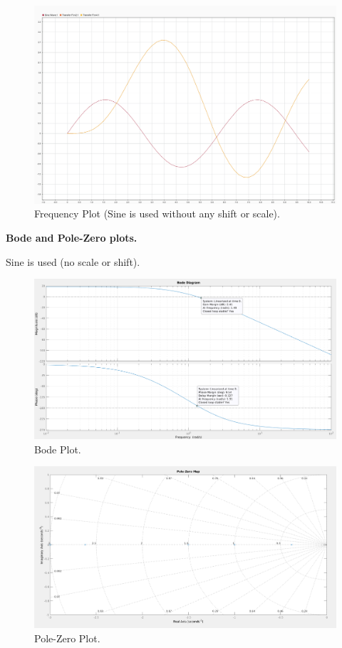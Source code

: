\documentclass{article}
\begin{document}
        \begin{figure}[hbt!]
            \centering
            \includegraphics[scale=0.3]{hm2_frequencyplot.png}
            \caption{Frequency Plot (Sine is used without any shift or scale).}
        \end{figure}
        
        \newpage
        
        \noindent
        \textbf{Bode and Pole-Zero plots.}
        
        Sine is used (no scale or shift).
        
        \begin{figure}[hbt!]
            \centering
            \includegraphics[scale=0.2]{hm2_bodeplot.png}
            \caption{Bode Plot.}
        \end{figure}
    
        \begin{figure}[hbt!]
            \centering
            \includegraphics[scale=0.2]{hm2_polezeroplot.png}
            \caption{Pole-Zero Plot.}
        \end{figure}
        
\end{document}
